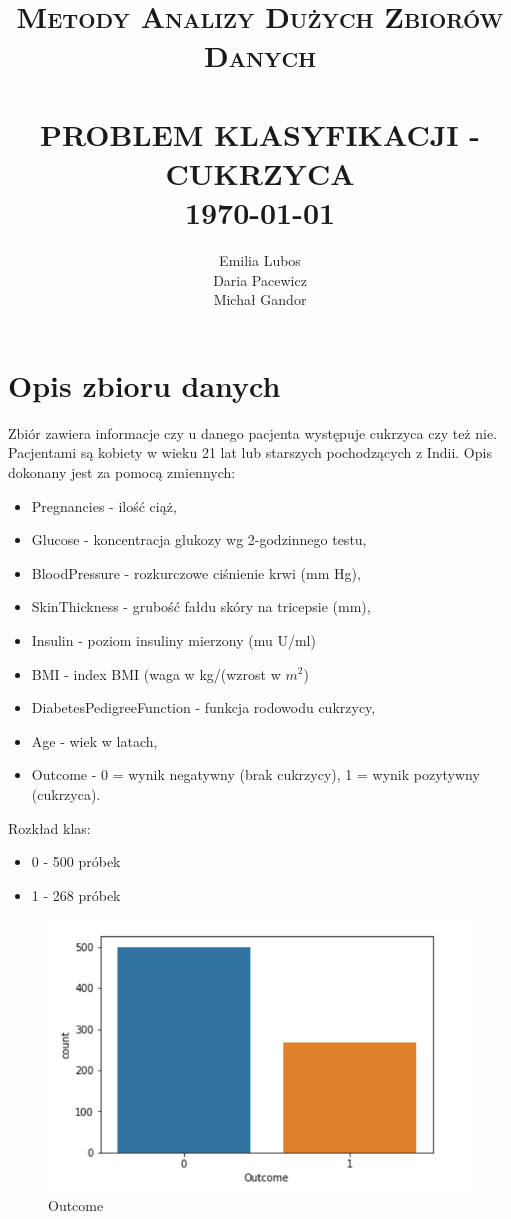 \documentclass[12pt]{article}
\title{	\normalsize \textsc{Metody Analizy Dużych Zbiorów Danych} 	%
		 	\\[2.0cm]								%
			\HRule{0.5pt} \\						%
			\LARGE \textbf{\uppercase{Problem klasyfikacji - cukrzyca}}	%
			\HRule{2pt} \\ [0.5cm]		%
			\normalsize \today			%
		}
\author{
		Emilia Lubos\\
		Daria Pacewicz\\
		Michał Gandor\\		
}
\makeatletter
\def\printtitle{%
    {\centering \@title\par}}
\def\printauthor{%
    {\centering \large \@author}}
\makeatother
\begin{document}
\thispagestyle{empty}		%

\printtitle					%
\vfill
\printauthor				%

\newpage
\tableofcontents
\newpage
\section{Opis zbioru danych}

Zbiór zawiera informacje czy u danego pacjenta występuje cukrzyca czy też nie. Pacjentami są kobiety w wieku 21 lat lub starszych pochodzących z Indii. Opis dokonany jest za pomocą zmiennych:

\begin{itemize}
	\item Pregnancies - ilość ciąż,
	\item Glucose - koncentracja glukozy wg 2-godzinnego testu,
	\item BloodPressure - rozkurczowe ciśnienie krwi (mm Hg),
	\item SkinThickness - grubość fałdu skóry na tricepsie (mm),
	\item Insulin - poziom insuliny mierzony (mu U/ml)
	\item BMI - index BMI (waga w kg/(wzrost w $m^2$)
	\item DiabetesPedigreeFunction - funkcja rodowodu cukrzycy,
	\item Age - wiek w latach,
	\item Outcome - 0 = wynik negatywny (brak cukrzycy), 1 = wynik pozytywny (cukrzyca).
\end{itemize}

Rozkład klas:

\begin{itemize}
	\item 0 - 500 próbek
	\item 1 - 268 próbek
\end{itemize}

\begin{figure}
	\centering
	\includegraphics{images/outcome.png}
	\caption{Outcome}
	\label{fig:outcome}
\end{figure}
\end{document}
